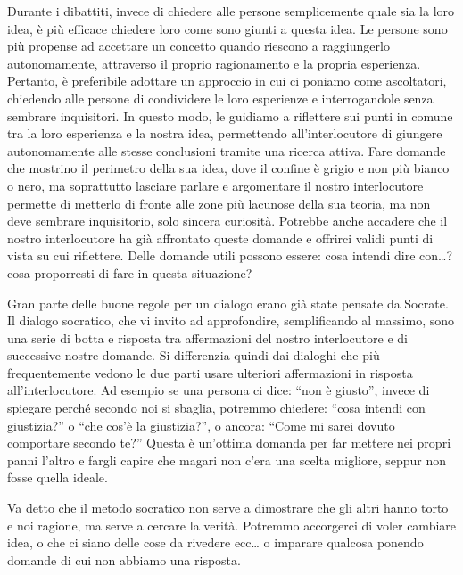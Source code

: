 \documentclass[12pt]{book} %
\begin{document}
Durante i dibattiti, invece di chiedere alle persone semplicemente quale sia la loro idea, è più efficace chiedere loro
come sono giunti a questa idea. Le persone sono più propense ad accettare un concetto quando riescono a raggiungerlo
autonomamente, attraverso il proprio ragionamento e la propria esperienza. Pertanto, è preferibile adottare un
approccio in cui ci poniamo come ascoltatori, chiedendo alle persone di condividere le loro esperienze e interrogandole
senza sembrare inquisitori. In questo modo, le guidiamo a riflettere sui punti in comune tra la loro esperienza e la
nostra idea, permettendo all'interlocutore di giungere autonomamente alle stesse conclusioni tramite una ricerca
attiva. Fare domande che mostrino il perimetro della sua idea, dove il confine è grigio e non più bianco o nero, ma
soprattutto lasciare parlare e argomentare il nostro interlocutore permette di metterlo di fronte alle zone più
lacunose della sua teoria, ma non deve sembrare inquisitorio, solo sincera curiosità. Potrebbe anche accadere che il
nostro interlocutore ha già affrontato queste domande e offrirci validi punti di vista su cui riflettere. Delle domande
utili possono essere: cosa intendi dire con…? cosa proporresti di fare in questa situazione?

Gran parte delle buone regole per un dialogo erano già state pensate da Socrate. Il dialogo socratico, che vi invito ad
approfondire, semplificando al massimo, sono una serie di botta e risposta tra affermazioni del nostro interlocutore e
di successive nostre domande. Si differenzia quindi dai dialoghi che più frequentemente vedono le due parti usare
ulteriori affermazioni in risposta all'interlocutore. Ad esempio se una persona ci dice: “non è
giusto”, invece di spiegare perché secondo noi si sbaglia, potremmo chiedere: “cosa intendi con giustizia?” o “che
cos'è la giustizia?”, o ancora: “Come mi sarei dovuto comportare secondo te?” Questa è
un'ottima domanda per far mettere nei propri panni l'altro e fargli capire
che magari non c'era una scelta migliore, seppur non fosse quella ideale.

Va detto che il metodo socratico non serve a dimostrare che gli altri hanno torto e noi ragione, ma serve a cercare la
verità. Potremmo accorgerci di voler cambiare idea, o che ci siano delle cose da rivedere ecc… o imparare qualcosa
ponendo domande di cui non abbiamo una risposta.
\end{document}
